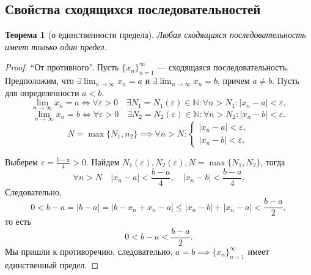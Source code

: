 \documentclass[a4paper,12pt]{article} %
\newtheorem{theorem}{Теорема}[section]
\theoremstyle{remark}
\theoremstyle{definition}
\begin{document}
\subsection{Свойства сходящихся последовательностей}
\begin{theorem}[о единственности предела]
	Любая сходящаяся последовательность имеет только один предел.	
\end{theorem}
\begin{proof}
	``От противного''. Пусть $\{x_n\}_{n=1}^{\infty}$ --- сходящаяся последовательность. Предположим, что $\exists \lim_{n \to \infty} x_{n} = a$ и $\exists \lim_{n \to \infty} x_{n} = b$, причем $a\neq b$. Пусть для определенности $a<b$.
	\[
	\lim_{n \to \infty} x_{n} = a \iff \forall \varepsilon>0 \quad \exists N_1=N_1(\varepsilon)\in \mathbb{N} : \forall n>N_1 : |x_{n}-a|<\varepsilon
	,\] 
	\[
	\lim_{n \to \infty} x_{n} = b \iff \forall \varepsilon>0 \quad \exists N_2=N_2(\varepsilon)\in \mathbb{N} : \forall n>N_2 : |x_{n}-b|<\varepsilon
	.\] 
	\[
		N = \max\{N_1, n_2\} \implies \forall n>N : 
		\begin{cases}
			|x_{n}-a| < \varepsilon, \\
			|x_{n}-b| < \varepsilon.
		\end{cases}
	\] 
\begin{center}
\end{center}
Выберем $\varepsilon = \frac{b-a}{4} > 0$. Найдем $N_1(\varepsilon), N_2(\varepsilon), N=\max\{N_1, N_2\}$, тогда
\[
	\forall n>N \quad |x_{n}-a| < \frac{b-a}{4}, \quad |x_{n}-b| < \frac{b-a}{4}
.\] 
Следовательно,
\[
	0 < b-a = |b-a| = |b-x_{n}+x_{n}-a| \le |x_{n}-b|+|x_{n}-a| < \frac{b-a}{2}
,\] 
то есть
\[
0 < b-a < \frac{b-a}{2}
.\] 
Мы пришли к противоречию, следовательно, $a=b \implies \{x_n\}_{n=1}^{\infty}$ имеет единственный предел.
\end{proof}
\end{document}
